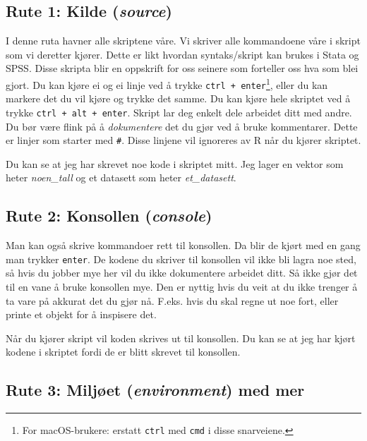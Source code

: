 \documentclass[
  letterpaper,
  DIV=11,
  numbers=noendperiod]{scrreprt}
\begin{document}
\hypertarget{rute-1-kilde-source}{%
\subsection{\texorpdfstring{Rute 1: Kilde
(\emph{source})}{Rute 1: Kilde (source)}}\label{rute-1-kilde-source}}

I denne ruta havner alle skriptene våre. Vi skriver alle kommandoene
våre i skript som vi deretter kjører. Dette er likt hvordan
syntaks/skript kan brukes i Stata og SPSS. Disse skripta blir en
oppskrift for oss seinere som forteller oss hva som blei gjort. Du kan
kjøre ei og ei linje ved å trykke \texttt{ctrl\ +\ enter}\footnote{For
  macOS-brukere: erstatt \texttt{ctrl} med \texttt{cmd} i disse
  snarveiene.}, eller du kan markere det du vil kjøre og trykke det
samme. Du kan kjøre hele skriptet ved å trykke
\texttt{ctrl\ +\ alt\ +\ enter}. Skript lar deg enkelt dele arbeidet
ditt med andre. Du bør være flink på å \emph{dokumentere} det du gjør
ved å bruke kommentarer. Dette er linjer som starter med \texttt{\#}.
Disse linjene vil ignoreres av R når du kjører skriptet.

Du kan se at jeg har skrevet noe kode i skriptet mitt. Jeg lager en
vektor som heter \emph{noen\_tall} og et datasett som heter
\emph{et\_datasett}.

\hypertarget{rute-2-konsollen-console}{%
\subsection{\texorpdfstring{Rute 2: Konsollen
(\emph{console})}{Rute 2: Konsollen (console)}}\label{rute-2-konsollen-console}}

Man kan også skrive kommandoer rett til konsollen. Da blir de kjørt med
en gang man trykker \texttt{enter}. De kodene du skriver til konsollen
vil ikke bli lagra noe sted, så hvis du jobber mye her vil du ikke
dokumentere arbeidet ditt. Så ikke gjør det til en vane å bruke
konsollen mye. Den er nyttig hvis du veit at du ikke trenger å ta vare
på akkurat det du gjør nå. F.eks. hvis du skal regne ut noe fort, eller
printe et objekt for å inspisere det.

Når du kjører skript vil koden skrives ut til konsollen. Du kan se at
jeg har kjørt kodene i skriptet fordi de er blitt skrevet til konsollen.

\hypertarget{rute-3-miljuxf8et-environment-med-mer}{%
\subsection{\texorpdfstring{Rute 3: Miljøet (\emph{environment}) med
mer}{Rute 3: Miljøet (environment) med mer}}\label{rute-3-miljuxf8et-environment-med-mer}}
\end{document}
